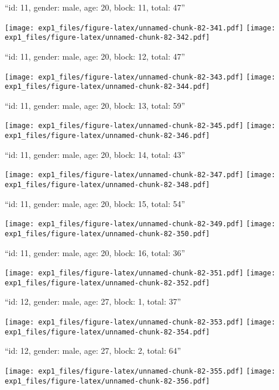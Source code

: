 \documentclass[11pt,,]{article}
\begin{document}
\newpage
[1] 

``id: 11, gender: male, age: 20, block: 11, total: 47''

\texttt{[image: exp1\_files/figure-latex/unnamed-chunk-82-341.pdf]}
\texttt{[image: exp1\_files/figure-latex/unnamed-chunk-82-342.pdf]}

\newpage
[1] 

``id: 11, gender: male, age: 20, block: 12, total: 47''

\texttt{[image: exp1\_files/figure-latex/unnamed-chunk-82-343.pdf]}
\texttt{[image: exp1\_files/figure-latex/unnamed-chunk-82-344.pdf]}

\newpage
[1] 

``id: 11, gender: male, age: 20, block: 13, total: 59''

\texttt{[image: exp1\_files/figure-latex/unnamed-chunk-82-345.pdf]}
\texttt{[image: exp1\_files/figure-latex/unnamed-chunk-82-346.pdf]}

\newpage
[1] 

``id: 11, gender: male, age: 20, block: 14, total: 43''

\texttt{[image: exp1\_files/figure-latex/unnamed-chunk-82-347.pdf]}
\texttt{[image: exp1\_files/figure-latex/unnamed-chunk-82-348.pdf]}

\newpage
[1] 

``id: 11, gender: male, age: 20, block: 15, total: 54''

\texttt{[image: exp1\_files/figure-latex/unnamed-chunk-82-349.pdf]}
\texttt{[image: exp1\_files/figure-latex/unnamed-chunk-82-350.pdf]}

\newpage
[1] 

``id: 11, gender: male, age: 20, block: 16, total: 36''

\texttt{[image: exp1\_files/figure-latex/unnamed-chunk-82-351.pdf]}
\texttt{[image: exp1\_files/figure-latex/unnamed-chunk-82-352.pdf]}

\newpage
[1] 

``id: 12, gender: male, age: 27, block: 1, total: 37''

\texttt{[image: exp1\_files/figure-latex/unnamed-chunk-82-353.pdf]}
\texttt{[image: exp1\_files/figure-latex/unnamed-chunk-82-354.pdf]}

\newpage
[1] 

``id: 12, gender: male, age: 27, block: 2, total: 64''

\texttt{[image: exp1\_files/figure-latex/unnamed-chunk-82-355.pdf]}
\texttt{[image: exp1\_files/figure-latex/unnamed-chunk-82-356.pdf]}
\end{document}
